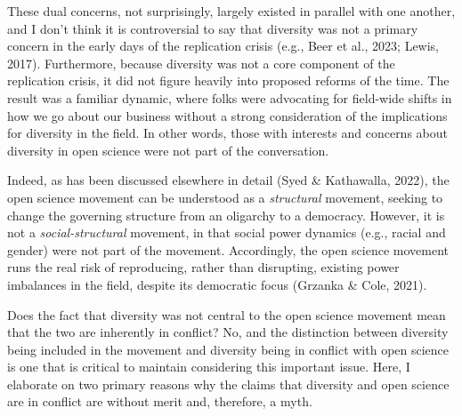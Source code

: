 \documentclass[authordate, empirical,issue]{jote-new-article}
\begin{document}
These dual concerns, not surprisingly, largely existed in parallel with one another, and I don't think it is controversial to say that diversity was not a primary concern in the early days of the replication crisis (e.g., Beer et al., 2023; Lewis, 2017). Furthermore, because diversity was not a core component of the replication crisis, it did not figure heavily into proposed reforms of the time. The result was a familiar dynamic, where folks were advocating for field-wide shifts in how we go about our business without a strong consideration of the implications for diversity in the field. In other words, those with interests and concerns about diversity in open science were not part of the conversation.







Indeed, as has been discussed elsewhere in detail (Syed \& Kathawalla, 2022), the open science movement can be understood as a \emph{structural} movement, seeking to change the governing structure from an oligarchy to a democracy. However, it is not a \emph{social-structural} movement, in that social power dynamics (e.g., racial and gender) were not part of the movement. Accordingly, the open science movement runs the real risk of reproducing, rather than disrupting, existing power imbalances in the field, despite its democratic focus (Grzanka \& Cole, 2021).







Does the fact that diversity was not central to the open science movement mean that the two are inherently in conflict? No, and the distinction between diversity being included in the movement and diversity being in conflict with open science is one that is critical to maintain considering this important issue. Here, I elaborate on two primary reasons why the claims that diversity and open science are in conflict are without merit and, therefore, a myth.
\end{document}
